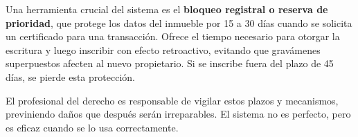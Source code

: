 \documentclass[12pt,oneside]{book}
\begin{document}
Una herramienta crucial del sistema es el \textbf{bloqueo registral o reserva de prioridad}, que protege los datos del inmueble por 15 a 30 días cuando se solicita un certificado para una transacción. Ofrece el tiempo necesario para otorgar la escritura y luego inscribir con efecto retroactivo, evitando que gravámenes superpuestos afecten al nuevo propietario. Si se inscribe fuera del plazo de 45 días, se pierde esta protección.

El profesional del derecho es responsable de vigilar estos plazos y mecanismos, previniendo daños que después serán irreparables. El sistema no es perfecto, pero es eficaz cuando se lo usa correctamente.
\end{document}
